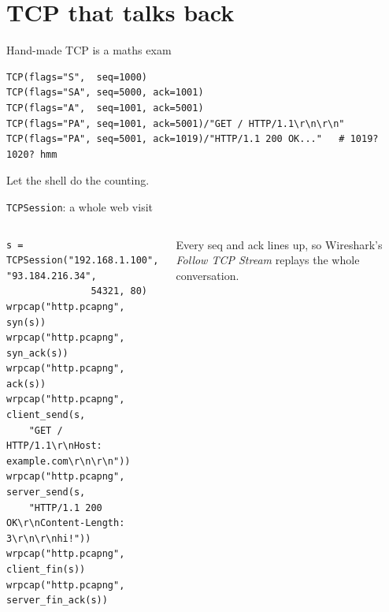 \documentclass[aspectratio=169,11pt]{beamer}
\newcommand{\cmd}[1]{\texttt{\textcolor{wire}{#1}}}
\begin{document}
\section{TCP that talks back}

\begin{frame}[fragile]{Hand-made TCP is a maths exam}
\begin{lstlisting}
TCP(flags="S",  seq=1000)
TCP(flags="SA", seq=5000, ack=1001)
TCP(flags="A",  seq=1001, ack=5001)
TCP(flags="PA", seq=1001, ack=5001)/"GET / HTTP/1.1\r\n\r\n"
TCP(flags="PA", seq=5001, ack=1019)/"HTTP/1.1 200 OK..."   # 1019? 1020? hmm
\end{lstlisting}
\pause
\begin{center}
\Large Let the shell do the counting. \faSmileWink[regular]
\end{center}
\end{frame}

\begin{frame}[fragile]{\cmd{TCPSession}: a whole web visit}
\begin{columns}[T]
\begin{lstlisting}[basicstyle=\ttfamily\scriptsize\color{ink}]
s = TCPSession("192.168.1.100", "93.184.216.34",
               54321, 80)
wrpcap("http.pcapng", syn(s))
wrpcap("http.pcapng", syn_ack(s))
wrpcap("http.pcapng", ack(s))
wrpcap("http.pcapng", client_send(s,
    "GET / HTTP/1.1\r\nHost: example.com\r\n\r\n"))
wrpcap("http.pcapng", server_send(s,
    "HTTP/1.1 200 OK\r\nContent-Length: 3\r\n\r\nhi!"))
wrpcap("http.pcapng", client_fin(s))
wrpcap("http.pcapng", server_fin_ack(s))
\end{lstlisting}
\small Every seq and ack lines up, so Wireshark's \emph{Follow TCP Stream}
replays the whole conversation.
\end{columns}
\end{frame}
\end{document}
